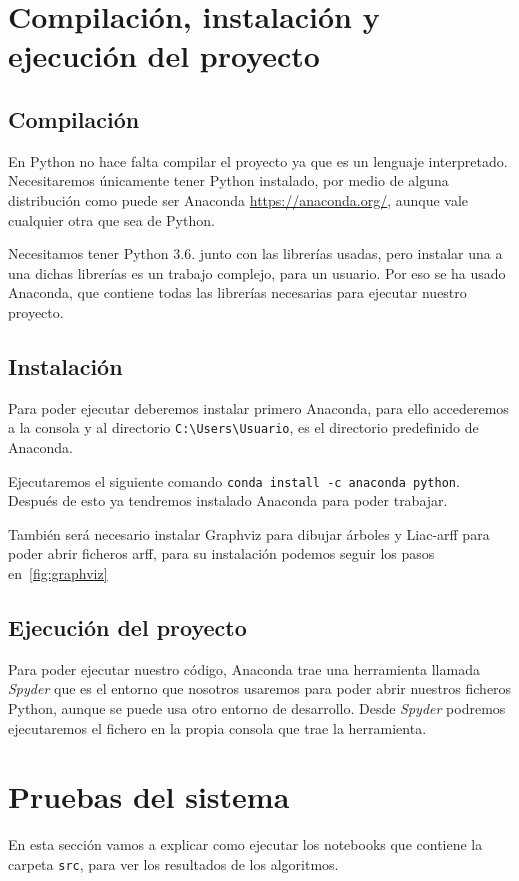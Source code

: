 \section{Compilación, instalación y ejecución del proyecto}
\subsection{Compilación}
En Python no hace falta compilar el proyecto ya que es un lenguaje interpretado. Necesitaremos únicamente tener Python instalado, por medio de alguna distribución como puede ser Anaconda \url{https://anaconda.org/}, aunque vale cualquier otra que sea de Python.

Necesitamos tener Python 3.6. junto con las librerías usadas, pero instalar una a una dichas librerías es un trabajo complejo, para un usuario. Por eso se ha usado Anaconda, que contiene todas las librerías necesarias para ejecutar nuestro proyecto.

\subsection{Instalación}
Para poder ejecutar deberemos instalar primero Anaconda, para ello accederemos a la consola y al directorio \texttt{C:\textbackslash Users\textbackslash Usuario}, es el directorio predefinido de Anaconda.

Ejecutaremos el siguiente comando \texttt{conda install -c anaconda python}. Después de esto ya tendremos instalado Anaconda para poder trabajar.

También será necesario instalar Graphviz para dibujar árboles y Liac-arff para poder abrir ficheros arff, para su instalación podemos seguir los pasos en~\ref{fig:graphviz}

\subsection{Ejecución del proyecto}
Para poder ejecutar nuestro código, Anaconda trae una herramienta llamada \textit{Spyder} que es el entorno que nosotros usaremos para poder abrir nuestros ficheros Python, aunque se puede usa otro entorno de desarrollo. Desde \textit{Spyder} podremos ejecutaremos el fichero en la propia consola que trae la herramienta.

\section{Pruebas del sistema}
En esta sección vamos a explicar como ejecutar los notebooks que contiene la carpeta \texttt{src}, para ver los resultados de los algoritmos. 


